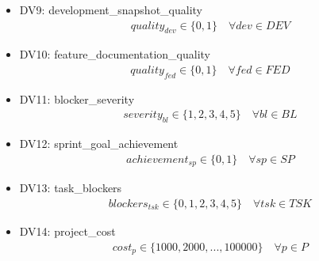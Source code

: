 \documentclass{article}
\begin{document}
\begin{itemize}
    \item DV9: development\_snapshot\_quality
        \begin{align*}
            quality_{dev} \in \{0, 1\} \quad \forall dev \in DEV
        \end{align*}
    \item DV10: feature\_documentation\_quality
        \begin{align*}
            quality_{fed} \in \{0, 1\} \quad \forall fed \in FED
        \end{align*}
    \item DV11: blocker\_severity
        \begin{align*}
            severity_{bl} \in \{1, 2, 3, 4, 5\} \quad \forall bl \in BL
        \end{align*}
    \item DV12: sprint\_goal\_achievement
        \begin{align*}
            achievement_{sp} \in \{0, 1\} \quad \forall sp \in SP
        \end{align*}
    \item DV13: task\_blockers
        \begin{align*}
            blockers_{tsk} \in \{0, 1, 2, 3, 4, 5\} \quad \forall tsk \in TSK
        \end{align*}
    \item DV14: project\_cost
        \begin{align*}
            cost_{p} \in \{1000, 2000, ..., 100000\} \quad \forall p \in P
        \end{align*}
\end{itemize}
\end{document}
